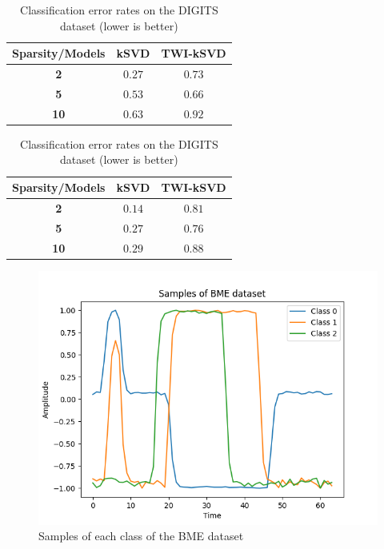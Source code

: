 \documentclass[11pt]{article}
\begin{document}
\begin{table}[!ht]
    \begin{minipage}{.55\linewidth}
      \centering
        \begin{tabular}{ccc}
            \toprule
            \textbf{Sparsity/Models} & \textbf{kSVD} & \textbf{TWI-kSVD} \\
            \midrule
            \textbf{2} & $\bm{0.27}$ & $0.73$ \\
            \textbf{5} & $0.53$ & $\bm{0.66}$ \\
            \textbf{10} & $0.63$ & $0.92$ \\
            \bottomrule
        \end{tabular}
        \caption{Original classification strategy}
    \end{minipage}
    \begin{minipage}{.35\linewidth}
      \centering
        \begin{tabular}{ccc}
            \toprule
            \textbf{Sparsity/Models} & \textbf{kSVD} & \textbf{TWI-kSVD} \\
            \midrule
            \textbf{2} & $\bm{0.14}$ & $0.81$ \\
            \textbf{5} & $0.27$ & $\bm{0.76}$ \\
            \textbf{10} & $0.29$ & $0.88$ \\
            \bottomrule
        \end{tabular}
        \caption{Our classification strategy}
    \end{minipage} 
    \caption{Classification error rates on the DIGITS dataset (lower is better)}
    \label{tab:classif_results_DIGITS}
\end{table}

\begin{figure}[!ht]
    \centering
    \includegraphics[scale=0.7]{../../figures/BME_samples.png}
    \caption{Samples of each class of the BME dataset} \label{fig:BME_samples}
\end{figure}
\end{document}
